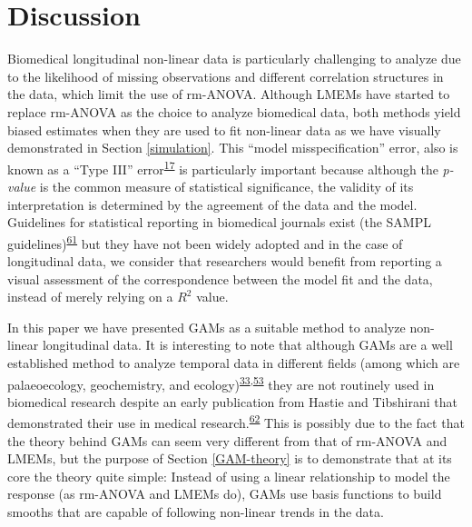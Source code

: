 \documentclass[
]{article}
\begin{document}
\hypertarget{discussion}{%
\section{Discussion}\label{discussion}}

Biomedical longitudinal non-linear data is particularly challenging to analyze due to the likelihood of missing observations and different correlation structures in the data, which limit the use of rm-ANOVA. Although LMEMs have started to replace rm-ANOVA as the choice to analyze biomedical data, both methods yield biased estimates when they are used to fit non-linear data as we have visually demonstrated in Section \ref{simulation}. This ``model misspecification'' error, also is known as a ``Type III'' error\textsuperscript{\protect\hyperlink{ref-dennis2019}{17}} is particularly important because although the \emph{p-value} is the common measure of statistical significance, the validity of its interpretation is determined by the agreement of the data and the model. Guidelines for statistical reporting in biomedical journals exist (the SAMPL guidelines)\textsuperscript{\protect\hyperlink{ref-lang2015}{61}} but they have not been widely adopted and in the case of longitudinal data, we consider that researchers would benefit from reporting a visual assessment of the correspondence between the model fit and the data, instead of merely relying on a \(R^2\) value.

In this paper we have presented GAMs as a suitable method to analyze non-linear longitudinal data. It is interesting to note that although GAMs are a well established method to analyze temporal data in different fields (among which are palaeoecology, geochemistry, and ecology)\textsuperscript{\protect\hyperlink{ref-pedersen2019}{33},\protect\hyperlink{ref-hefley2017}{53}} they are not routinely used in biomedical research despite an early publication from Hastie and Tibshirani that demonstrated their use in medical research.\textsuperscript{\protect\hyperlink{ref-hastie1995}{62}} This is possibly due to the fact that the theory behind GAMs can seem very different from that of rm-ANOVA and LMEMs, but the purpose of Section \ref{GAM-theory} is to demonstrate that at its core the theory quite simple: Instead of using a linear relationship to model the response (as rm-ANOVA and LMEMs do), GAMs use basis functions to build smooths that are capable of following non-linear trends in the data.
\end{document}
